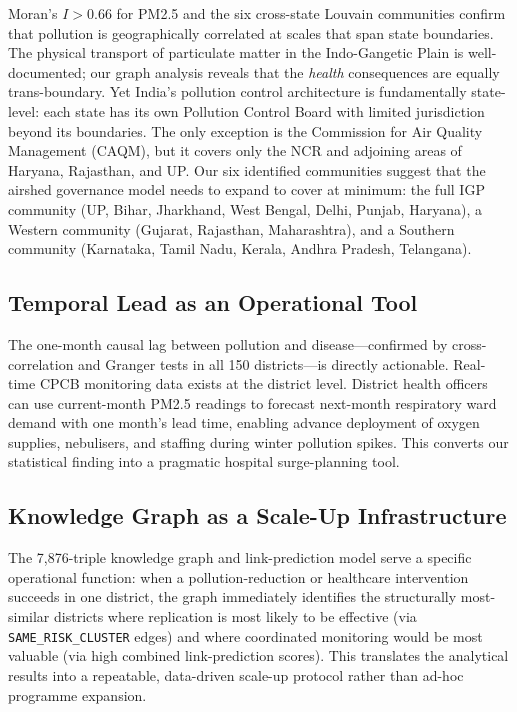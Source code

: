 \documentclass{article}
\begin{document}
Moran's $I > 0.66$ for PM2.5 and the six cross-state Louvain communities confirm that
pollution is geographically correlated at scales that span state boundaries. The physical
transport of particulate matter in the Indo-Gangetic Plain is well-documented; our graph
analysis reveals that the \emph{health} consequences are equally trans-boundary. Yet
India's pollution control architecture is fundamentally state-level: each state has its
own Pollution Control Board with limited jurisdiction beyond its boundaries. The only
exception is the Commission for Air Quality Management (CAQM), but it covers only the
NCR and adjoining areas of Haryana, Rajasthan, and UP. Our six identified communities
suggest that the airshed governance model needs to expand to cover at minimum: the full
IGP community (UP, Bihar, Jharkhand, West Bengal, Delhi, Punjab, Haryana), a Western
community (Gujarat, Rajasthan, Maharashtra), and a Southern community (Karnataka, Tamil
Nadu, Kerala, Andhra Pradesh, Telangana).

\subsection{Temporal Lead as an Operational Tool}

The one-month causal lag between pollution and disease---confirmed by cross-correlation
and Granger tests in all 150 districts---is directly actionable. Real-time CPCB monitoring
data exists at the district level. District health officers can use current-month PM2.5
readings to forecast next-month respiratory ward demand with one month's lead time, enabling
advance deployment of oxygen supplies, nebulisers, and staffing during winter pollution
spikes. This converts our statistical finding into a pragmatic hospital surge-planning tool.

\subsection{Knowledge Graph as a Scale-Up Infrastructure}

The 7,876-triple knowledge graph and link-prediction model serve a specific operational
function: when a pollution-reduction or healthcare intervention succeeds in one district,
the graph immediately identifies the structurally most-similar districts where replication
is most likely to be effective (via \texttt{SAME\_RISK\_CLUSTER} edges) and where
coordinated monitoring would be most valuable (via high combined link-prediction scores).
This translates the analytical results into a repeatable, data-driven scale-up protocol
rather than ad-hoc programme expansion.
\end{document}
